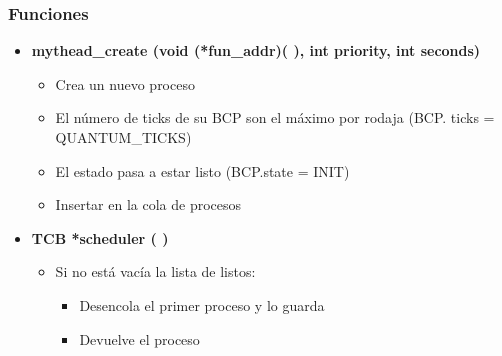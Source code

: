 \documentclass[10pt, spanish, pdftex]{template/UC3M_document}
\begin{document}
\subsubsection{Funciones}
\begin{itemize}
 \setlength{\itemsep}{-1.5mm}
    \item \textbf{mythead\_create (void (*fun\_addr)( ), int priority, int seconds)}
    \vspace{-2mm}
    \begin{itemize}
     \setlength{\itemsep}{-1.5mm}
        \item Crea un nuevo proceso 
        \item El número de ticks de su BCP son el máximo por rodaja (BCP. ticks = QUANTUM\_TICKS)
        \item El estado pasa a estar listo (BCP.state = INIT)
        \item Insertar en la cola de procesos
    \end{itemize}
    
    \item \textbf{TCB *scheduler ( )}
    \vspace{-2mm}
    \begin{itemize}
     \setlength{\itemsep}{-1.5mm}
        \item Si no está vacía la lista de listos:
        \vspace{-2mm}
        \begin{itemize}
        \setlength{\itemsep}{-1.5mm}
            \item Desencola el primer proceso y lo guarda 
            \item Devuelve el proceso
        \end{itemize}
    \end{itemize}
    

\end{itemize}
\end{document}

